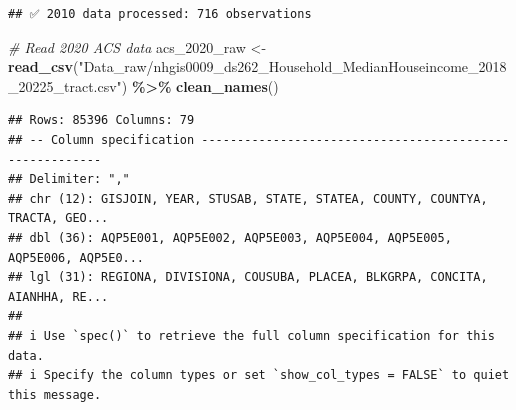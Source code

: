 \documentclass[
]{article}
\newenvironment{Shaded}{\begin{snugshade}}{\end{snugshade}}
\newcommand{\CommentTok}[1]{\textcolor[rgb]{0.56,0.35,0.01}{\textit{#1}}}
\newcommand{\FunctionTok}[1]{\textcolor[rgb]{0.13,0.29,0.53}{\textbf{#1}}}
\newcommand{\NormalTok}[1]{#1}
\newcommand{\OtherTok}[1]{\textcolor[rgb]{0.56,0.35,0.01}{#1}}
\newcommand{\SpecialCharTok}[1]{\textcolor[rgb]{0.81,0.36,0.00}{\textbf{#1}}}
\newcommand{\StringTok}[1]{\textcolor[rgb]{0.31,0.60,0.02}{#1}}
\begin{document}
\begin{verbatim}
## ✅ 2010 data processed: 716 observations
\end{verbatim}

\begin{Shaded}
\begin{Highlighting}[]
\CommentTok{\# Read 2020 ACS data}
\NormalTok{acs\_2020\_raw }\OtherTok{\textless{}{-}} \FunctionTok{read\_csv}\NormalTok{(}\StringTok{"Data\_raw/nhgis0009\_ds262\_Household\_MedianHouseincome\_2018\_20225\_tract.csv"}\NormalTok{) }\SpecialCharTok{\%\textgreater{}\%}
  \FunctionTok{clean\_names}\NormalTok{()}
\end{Highlighting}
\end{Shaded}

\begin{verbatim}
## Rows: 85396 Columns: 79
## -- Column specification --------------------------------------------------------
## Delimiter: ","
## chr (12): GISJOIN, YEAR, STUSAB, STATE, STATEA, COUNTY, COUNTYA, TRACTA, GEO...
## dbl (36): AQP5E001, AQP5E002, AQP5E003, AQP5E004, AQP5E005, AQP5E006, AQP5E0...
## lgl (31): REGIONA, DIVISIONA, COUSUBA, PLACEA, BLKGRPA, CONCITA, AIANHHA, RE...
## 
## i Use `spec()` to retrieve the full column specification for this data.
## i Specify the column types or set `show_col_types = FALSE` to quiet this message.
\end{verbatim}
\end{document}
